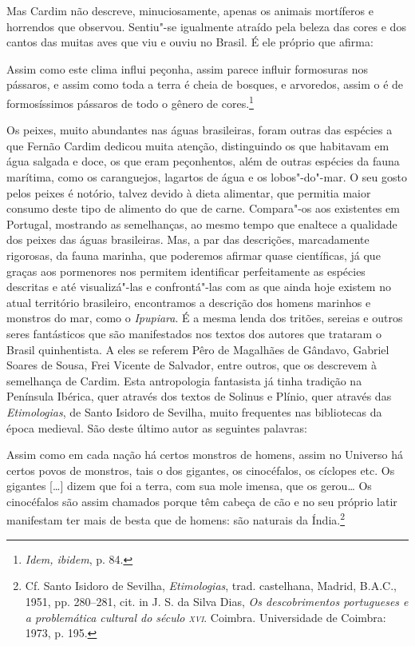 Mas Cardim não descreve, minuciosamente, apenas os animais
mortíferos e horrendos que observou. Sentiu"-se igualmente atraído pela
beleza das cores e dos cantos das muitas aves que viu e ouviu no
Brasil. É ele próprio que afirma:

\begin{hedraquote}
Assim como este clima influi peçonha, assim parece influir formosuras nos pássaros, e assim
como toda a terra é cheia de bosques, e arvoredos, assim o é de formosíssimos pássaros de 
todo o gênero de cores.\footnote{  \textit{Idem, ibidem}, p. 84.}
\end{hedraquote}

 Os peixes, muito abundantes nas águas brasileiras, foram
outras das espécies a que Fernão Cardim dedicou muita atenção,
distinguindo os que habitavam em água salgada e doce, os que eram
peçonhentos, além de outras espécies da fauna marítima, como os
caranguejos, lagartos de água e os lobos"-do"-mar. O seu gosto pelos
peixes é notório, talvez devido à dieta alimentar, que permitia maior
consumo deste tipo de alimento do que de carne. Compara"-os aos
existentes em Portugal, mostrando as semelhanças, ao mesmo tempo que
enaltece a qualidade dos peixes das águas brasileiras. Mas, a par das
descrições, marcadamente rigorosas, da fauna marinha, que poderemos
afirmar quase científicas, já que graças aos pormenores nos permitem
identificar perfeitamente as espécies descritas e até visualizá"-las e
confrontá"-las com as que ainda hoje existem no atual território
brasileiro, encontramos a descrição dos homens marinhos e monstros do
mar, como o \textit{Ipupiara}. É a mesma lenda dos tritões,
sereias e outros seres fantásticos que são manifestados nos textos dos
autores que trataram o Brasil quinhentista. A eles se referem Pêro de
Magalhães de Gândavo, Gabriel Soares de Sousa, Frei Vicente de
Salvador, entre outros, que os descrevem à semelhança de Cardim. Esta
antropologia fantasista já tinha tradição na Península Ibérica, quer
através dos textos de Solinus e Plínio, quer através das
\textit{Etimologias}, de Santo Isidoro de Sevilha, muito frequentes nas
bibliotecas da época medieval. São deste último autor as seguintes palavras:

\begin{hedraquote}
Assim como em cada nação há certos monstros de homens,
assim no Universo há certos povos de monstros, tais o dos gigantes, os
cinocéfalos, os cíclopes etc. Os gigantes [\ldots{}] dizem que foi a terra,
com sua mole imensa, que os gerou\ldots{} Os cinocéfalos são assim chamados
porque têm cabeça de cão e no seu próprio latir manifestam ter mais de
besta que de homens: são naturais da Índia.\footnote{ Cf. Santo Isidoro 
de Sevilha, \textit{Etimologias}, trad. castelhana, Madrid, B.A.C., 1951, 
pp. 280--281, cit. in J. S. da Silva Dias, \textit{Os descobrimentos portugueses 
e a problemática cultural do século \textsc{xvi}}. Coimbra. Universidade de Coimbra: 1973, p. 195.}
\end{hedraquote}

